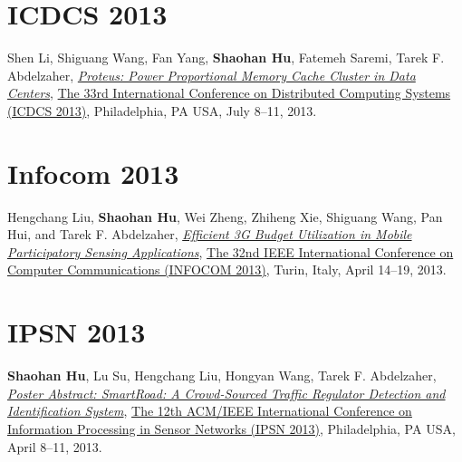 \section{\sc ICDCS 2013}\hypertarget{li2013icdcs}{}
Shen Li, Shiguang Wang, Fan Yang, \textbf{Shaohan Hu}, Fatemeh Saremi, Tarek F. Abdelzaher,
\href{http://ieeexplore.ieee.org/document/6681577}{\emph{Proteus: Power Proportional Memory Cache Cluster in Data Centers}},
\href{http://www.temple.edu/cis/icdcs2013/}{\textsf{The 33rd International Conference on Distributed Computing Systems (ICDCS 2013)}},
Philadelphia, PA USA, July 8--11, 2013.


\section{\sc Infocom 2013}\hypertarget{liu2013infocom}{}
Hengchang Liu, \textbf{Shaohan Hu}, Wei Zheng, Zhiheng Xie, Shiguang Wang, Pan Hui, and Tarek F. Abdelzaher,
\href{http://ieeexplore.ieee.org/document/6566935}{\emph{Efficient 3G Budget Utilization in Mobile Participatory Sensing Applications}},
\href{http://infocom2013.ieee-infocom.org/}{\textsf{The 32nd IEEE International Conference on Computer Communications (INFOCOM 2013)}},
Turin, Italy, April 14--19, 2013.

\section{\sc IPSN 2013}\hypertarget{hu2013ipsn}{}
\textbf{Shaohan Hu}, Lu Su, Hengchang Liu, Hongyan Wang, Tarek F. Abdelzaher,
\href{http://portal.acm.org/citation.cfm?id=2461433}{\emph{Poster Abstract: SmartRoad: A Crowd-Sourced Traffic Regulator Detection and Identification System}},
\href{http://ipsn.acm.org/2013/}{\textsf{The 12th ACM/IEEE International Conference on Information Processing in Sensor Networks (IPSN 2013)}},
Philadelphia, PA USA, April 8--11, 2013.


